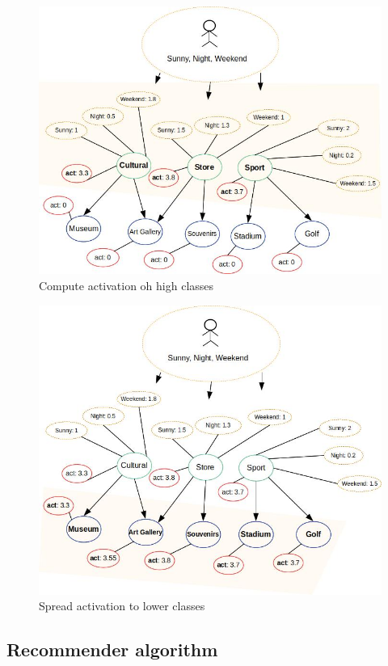\begin{figure}[h]
\centering
\includegraphics[scale=0.45]{draws/high_act.jpg}
\caption{Compute activation oh high classes}
\label{fig:high_act}
\end{figure}

\begin{figure}[h]
\centering
\includegraphics[scale=0.45]{draws/spread_act.jpg}
\caption{Spread activation to lower classes}
\label{fig:spread_act}
\end{figure}

\subsection{Recommender algorithm}

